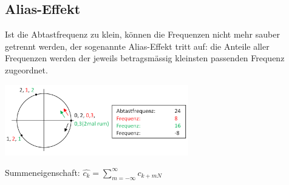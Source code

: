 	
\subsection{Alias-Effekt}
	Ist die Abtastfrequenz zu klein, k\"onnen die Frequenzen nicht mehr sauber getrennt werden, der sogenannte Alias-Effekt tritt auf:
	die Anteile aller Frequenzen werden der jeweils betragsm\"assig kleinsten passenden Frequenz zugeordnet.
	
	\begin{minipage}[c]{8.5cm}
		\includegraphics[width=8cm]{./bilder/Alias-effekt.png}
	\end{minipage}
	\begin{minipage}[c]{8cm}
		Summeneigenschaft: $\hat{c_k} = \sum\limits_{m=-\infty}^{\infty} c_{k+mN}$
	\end{minipage}
	
	
	